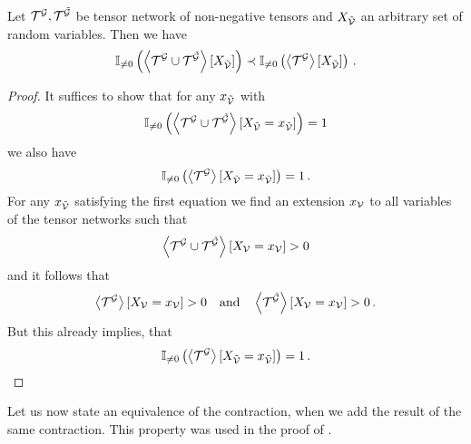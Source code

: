\begin{theorem}\label{the:monotonicityBinaryContractions}
	Let $\mathcal{T}^{\mathcal{G}}, \mathcal{T}^{\tilde{\mathcal{G}}}$ be tensor network of non-negative tensors and $X_{\tilde{\mathcal{V}}}$ an arbitrary set of random variables. %
	Then we have
	\begin{align*}
		\mathbb{I}_{\neq0}\left(\left\langle \mathcal{T}^{\mathcal{G}}\cup\mathcal{T}^{\tilde{\mathcal{G}}}\right\rangle \left[ X_{\tilde{\mathcal{V}}} \right]\right) \prec
		\mathbb{I}_{\neq0}\left(\left\langle \mathcal{T}^{\mathcal{G}}\right\rangle \left[ X_{\tilde{\mathcal{V}}} \right]\right) \, .
	\end{align*}
\end{theorem}
\begin{proof}
	It suffices to show that for any $x_{\tilde{\mathcal{V}}}$ with
		\[ \mathbb{I}_{\neq0}\left(\left\langle \mathcal{T}^{\mathcal{G}}\cup\mathcal{T}^{\tilde{\mathcal{G}}}\right\rangle \left[ X_{\tilde{\mathcal{V}}}=x_{\tilde{\mathcal{V}}} \right]\right)=1 \]
	we also have
		\[ \mathbb{I}_{\neq0}\left(\left\langle \mathcal{T}^{\mathcal{G}}\right\rangle \left[ X_{\tilde{\mathcal{V}}}=x_{\tilde{\mathcal{V}}} \right]\right)=1 \, . \]
	For any $x_{\tilde{\mathcal{V}}}$ satisfying the first equation we find an extension $x_{\mathcal{V}}$ to all variables of the tensor networks such that
		\[ \left\langle \mathcal{T}^{\mathcal{G}}\cup\mathcal{T}^{\tilde{\mathcal{G}}}\right\rangle \left[ X_{\mathcal{V}}=x_{\mathcal{V}} \right] > 0 \]
	and it follows that
		\[ \left\langle \mathcal{T}^{\mathcal{G}}\right\rangle \left[ X_{\mathcal{V}}=x_{\mathcal{V}} \right] > 0 \quad\text{and}\quad  \left\langle \mathcal{T}^{\tilde{\mathcal{G}}}\right\rangle \left[ X_{\mathcal{V}}=x_{\mathcal{V}} \right] > 0  \, . \]
	But this already implies, that
		\[ \mathbb{I}_{\neq0}\left(\left\langle \mathcal{T}^{\mathcal{G}}\right\rangle \left[ X_{\tilde{\mathcal{V}}}=x_{\tilde{\mathcal{V}}} \right]\right)=1 \, . \]
\end{proof}

Let us now state an equivalence of the contraction, when we add the result of the same contraction.
This property was used in the proof of .

